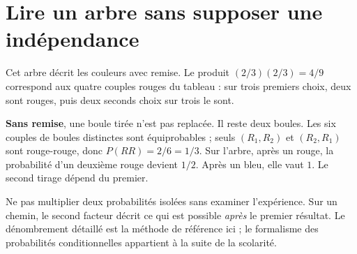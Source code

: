 \documentclass[../cours_3e.tex]{subfiles}
\begin{document}
\section{Lire un arbre sans supposer une indépendance}
\begin{center}
\end{center}
Cet arbre décrit les couleurs avec remise. Le produit $(2/3)(2/3)=4/9$ correspond aux quatre couples rouges du tableau : sur trois premiers choix, deux sont rouges, puis deux seconds choix sur trois le sont.

\textbf{Sans remise}, une boule tirée n'est pas replacée. Il reste deux boules. Les six couples de boules distinctes sont équiprobables ; seuls $(R_1,R_2)$ et $(R_2,R_1)$ sont rouge-rouge, donc $P(RR)=2/6=1/3$. Sur l'arbre, après un rouge, la probabilité d'un deuxième rouge devient $1/2$. Après un bleu, elle vaut $1$. Le second tirage dépend du premier.

\begin{attention}
Ne pas multiplier deux probabilités isolées sans examiner l'expérience. Sur un chemin, le second facteur décrit ce qui est possible \emph{après} le premier résultat. Le dénombrement détaillé est la méthode de référence ici ; le formalisme des probabilités conditionnelles appartient à la suite de la scolarité.
\end{attention}
\end{document}
